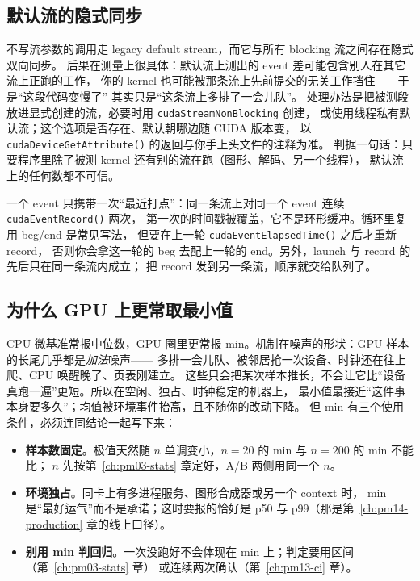 \documentclass[12pt,a4paper,fontset=fandol]{ctexbook}
\newcommand{\Fn}[1]{\texttt{#1()}}
\newcommand{\Tp}[1]{\texttt{#1}}
\newcommand{\Bk}{\discretionary{}{}{}}
\newcommand{\Mx}[1]{\textsf{#1}}
\begin{document}
\subsection{默认流的隐式同步}
\label{sub:pm11-default-stream}

不写流参数的调用走 legacy default stream，而它与所有 blocking 流之间存在隐式双向同步。
后果在测量上很具体：默认流上测出的 event 差可能包含别人在其它流上正跑的工作，
你的 kernel 也可能被那条流上先前提交的无关工作挡住——于是``这段代码变慢了''
其实只是``这条流上多排了一会儿队''。
处理办法是把被测段放进显式创建的流，必要时用 \Tp{cudaStream{\Bk}NonBlocking} 创建，
或使用线程私有默认流；这个选项是否存在、默认朝哪边随 CUDA 版本变，
以 \Fn{cudaDevice{\Bk}Get{\Bk}Attribute} 的返回与你手上头文件的注释为准。
判据一句话：只要程序里除了被测 kernel 还有别的流在跑（图形、解码、另一个线程），
默认流上的任何数都不可信。

\begin{note}[title={注记：event 复用与打点边界}]
\label{box:pm11-note-event}
一个 event 只携带一次``最近打点''：同一条流上对同一个 event 连续 \Fn{cudaEvent{\Bk}Record} 两次，
第一次的时间戳被覆盖，它不是环形缓冲。循环里复用 beg/end 是常见写法，
但要在上一轮 \Fn{cudaEvent{\Bk}ElapsedTime} 之后才重新 record，
否则你会拿这一轮的 beg 去配上一轮的 end。另外，launch 与 record 的先后只在同一条流内成立；
把 record 发到另一条流，顺序就交给队列了。
\end{note}

\subsection{为什么 GPU 上更常取最小值}
\label{sub:pm11-min}

CPU 微基准常报中位数，GPU 圈里更常报 min。机制在噪声的形状：GPU 样本的长尾几乎都是\emph{加法}噪声——
多排一会儿队、被邻居抢一次设备、时钟还在往上爬、CPU 唤醒晚了、页表刚建立。
这些只会把某次样本推长，不会让它比``设备真跑一遍''更短。所以在空闲、独占、时钟稳定的机器上，
最小值最接近``这件事本身要多久''；均值被环境事件抬高，且不随你的改动下降。
但 min 有三个使用条件，必须连同结论一起写下来：

\begin{itemize}
  \item \textbf{样本数固定}。极值天然随 $n$ 单调变小，$n=20$ 的 min 与 $n=200$ 的 min 不能比；
        $n$ 先按第~\ref{ch:pm03-stats} 章定好，A/B 两侧用同一个 $n$。
  \item \textbf{环境独占}。同卡上有多进程服务、图形合成器或另一个 context 时，
        min 是``最好运气''而不是承诺；这时要报的恰好是 \Mx{p50} 与 \Mx{p99}（那是第~\ref{ch:pm14-production} 章的线上口径）。
  \item \textbf{别用 min 判回归}。一次没跑好不会体现在 min 上；判定要用区间（第~\ref{ch:pm03-stats} 章）
        或连续两次确认（第~\ref{ch:pm13-ci} 章）。
\end{itemize}
\end{document}
